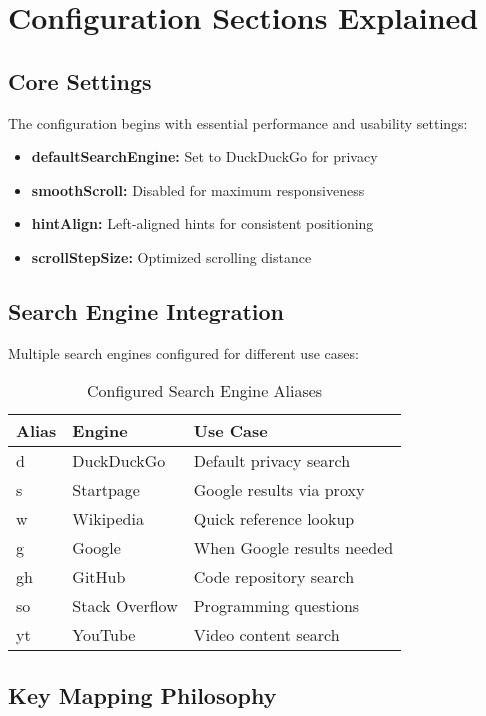 \documentclass[11pt,a4paper,oneside]{book}
\begin{document}
\section{Configuration Sections Explained}

\subsection{Core Settings}

The configuration begins with essential performance and usability settings:

\begin{itemize}
    \item \textbf{defaultSearchEngine:} Set to DuckDuckGo for privacy
    \item \textbf{smoothScroll:} Disabled for maximum responsiveness
    \item \textbf{hintAlign:} Left-aligned hints for consistent positioning
    \item \textbf{scrollStepSize:} Optimized scrolling distance
\end{itemize}

\subsection{Search Engine Integration}

Multiple search engines configured for different use cases:

\begin{table}[h]
\centering
\begin{tabular}{@{}lll@{}}
\toprule
\textbf{Alias} & \textbf{Engine} & \textbf{Use Case} \\
\midrule
d & DuckDuckGo & Default privacy search \\
s & Startpage & Google results via proxy \\
w & Wikipedia & Quick reference lookup \\
g & Google & When Google results needed \\
gh & GitHub & Code repository search \\
so & Stack Overflow & Programming questions \\
yt & YouTube & Video content search \\
\bottomrule
\end{tabular}
\caption{Configured Search Engine Aliases}
\end{table}

\subsection{Key Mapping Philosophy}
\end{document}
